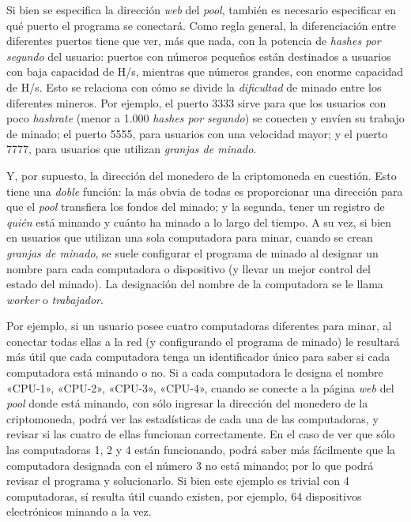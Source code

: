 \documentclass[12pt,a4paper,twoside]{book}
\begin{document}
Si bien se especifica la dirección \textit{web} del \textit{pool}, también es necesario especificar en qué puerto el programa se conectará. Como regla general, la diferenciación entre diferentes puertos tiene que ver, más que nada, con la potencia de \textit{hashes por segundo} del usuario: puertos con números pequeños están destinados a usuarios con baja capacidad de H/s, mientras que números grandes, con enorme capacidad de H/s. Esto se relaciona con cómo se divide la \textit{dificultad} de minado entre los diferentes mineros. Por ejemplo, el puerto 3333 sirve para que los usuarios con poco \textit{hashrate} (menor a 1.000 \textit{hashes por segundo}) se conecten y envíen su trabajo de minado; el puerto 5555, para usuarios con una velocidad mayor; y el puerto 7777, para usuarios que utilizan \textit{granjas de minado}.

Y, por supuesto, la dirección del monedero de la criptomoneda en cuestión. Esto tiene una \textit{doble} función: la más obvia de todas es proporcionar una dirección para que el \textit{pool} transfiera los fondos del minado; y la segunda, tener un registro de \textit{quién} está minando y cuánto ha minado a lo largo del tiempo. A su vez, si bien en usuarios que utilizan una sola computadora para minar, cuando se crean \textit{granjas de minado}, se suele configurar el programa de minado al designar un nombre para cada computadora o dispositivo (y llevar un mejor control del estado del minado). La designación del nombre de la computadora se le llama \textit{worker} o \textit{trabajador}.

Por ejemplo, si un usuario posee cuatro computadoras diferentes para minar, al conectar todas ellas a la red (y configurando el programa de minado) le resultará más útil que cada computadora tenga un identificador único para saber si cada computadora está minando o no. Si a cada computadora le designa el nombre «CPU-1», «CPU-2», «CPU-3», «CPU-4», cuando se conecte a la página \textit{web} del \textit{pool} donde está minando, con sólo ingresar la dirección del monedero de la criptomoneda, podrá ver las estadísticas de cada una de las computadoras, y revisar si las cuatro de ellas funcionan correctamente. En el caso de ver que sólo las computadoras 1, 2 y 4 están funcionando, podrá saber más fácilmente que la computadora designada con el número 3 no está minando; por lo que podrá revisar el programa y solucionarlo. Si bien este ejemplo es trivial con 4 computadoras, sí resulta útil cuando existen, por ejemplo, 64 dispositivos electrónicos minando a la vez.
\end{document}
